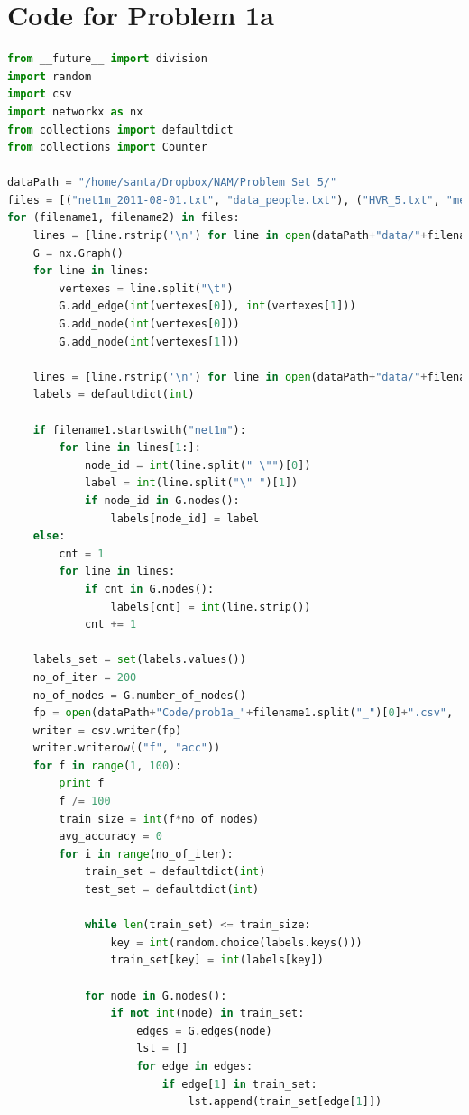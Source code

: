 \documentclass{article}
\begin{document}
\section*{Code for Problem 1a}
\begin{lstlisting}[language=Python, breaklines=true] 
from __future__ import division
import random
import csv
import networkx as nx
from collections import defaultdict
from collections import Counter

dataPath = "/home/santa/Dropbox/NAM/Problem Set 5/"
files = [("net1m_2011-08-01.txt", "data_people.txt"), ("HVR_5.txt", "metadata_CysPoLV.txt")]
for (filename1, filename2) in files:
    lines = [line.rstrip('\n') for line in open(dataPath+"data/"+filename1)]
    G = nx.Graph()
    for line in lines:
        vertexes = line.split("\t")
        G.add_edge(int(vertexes[0]), int(vertexes[1]))
        G.add_node(int(vertexes[0]))
        G.add_node(int(vertexes[1]))
    
    lines = [line.rstrip('\n') for line in open(dataPath+"data/"+filename2)]
    labels = defaultdict(int)
    
    if filename1.startswith("net1m"):
        for line in lines[1:]:
            node_id = int(line.split(" \"")[0])
            label = int(line.split("\" ")[1])
            if node_id in G.nodes():
                labels[node_id] = label
    else:
        cnt = 1
        for line in lines:
            if cnt in G.nodes():
                labels[cnt] = int(line.strip())
            cnt += 1
    
    labels_set = set(labels.values())
    no_of_iter = 200
    no_of_nodes = G.number_of_nodes()
    fp = open(dataPath+"Code/prob1a_"+filename1.split("_")[0]+".csv", 'a')
    writer = csv.writer(fp)
    writer.writerow(("f", "acc"))
    for f in range(1, 100):
        print f
        f /= 100
        train_size = int(f*no_of_nodes)
        avg_accuracy = 0
        for i in range(no_of_iter):
            train_set = defaultdict(int)
            test_set = defaultdict(int)
    
            while len(train_set) <= train_size:
                key = int(random.choice(labels.keys()))
                train_set[key] = int(labels[key])
    
            for node in G.nodes():
                if not int(node) in train_set:
                    edges = G.edges(node)
                    lst = []
                    for edge in edges:
                        if edge[1] in train_set:
                            lst.append(train_set[edge[1]])
    

\end{lstlisting}
\end{document}
